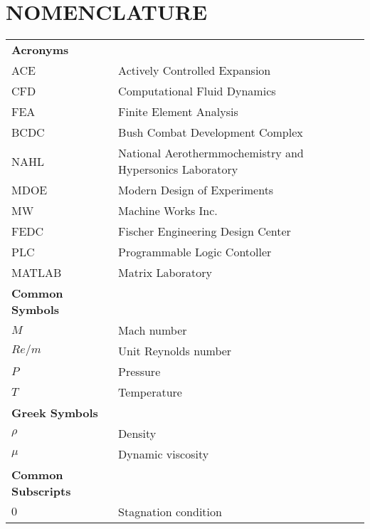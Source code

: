 %
% 
%


\chapter*{NOMENCLATURE}

\hspace*{-1.25in}
\vspace{-18pt}
\begin{spacing}{1.0}
    \begin{longtable}[htbp]{@{}p{} p{}@{}}
       
        \textbf{Acronyms}\\ [2ex] 
		ACE	& Actively Controlled Expansion\\ [2ex] %
		CFD	& Computational Fluid Dynamics\\ [2ex] 
		FEA & Finite Element Analysis\\	[2ex]
		BCDC & Bush Combat Development Complex\\ [2ex]
		NAHL & National Aerothermmochemistry and Hypersonics Laboratory\\ [2ex]
        MDOE & Modern Design of Experiments\\ [2ex]
		MW & Machine Works Inc.\\ [2ex]
		FEDC & Fischer Engineering Design Center\\ [2ex]
        PLC & Programmable Logic Contoller\\ [2ex]
        MATLAB & Matrix Laboratory\\ [2ex] 

        \textbf{Common Symbols}\\ [2ex] 
        $M$ & Mach number\\ [2ex]
        $Re/m$ & Unit Reynolds number\\ [2ex]
        $P$ & Pressure\\ [2ex]
        $T$ & Temperature\\ [2ex]

        \textbf{Greek Symbols}\\ [2ex] 
        $\rho$ & Density\\ [2ex]
        $\mu$ & Dynamic viscosity\\ [2ex]

        \textbf{Common Subscripts}\\ [2ex] 
        $0$ & Stagnation condition\\ [2ex] 

	\end{longtable}
\end{spacing}

\pagebreak{}
